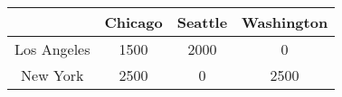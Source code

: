     \begin{tabular}{cccc}
            & Chicago & Seattle & Washington \bigstrut[b]\\
    \hline
    \hline
    Los Angeles & 1500    & 2000    & 0 \bigstrut[t]\\
    New York & 2500    & 0       & 2500 \bigstrut[b]\\
    \hline
    \hline
    \end{tabular}%
